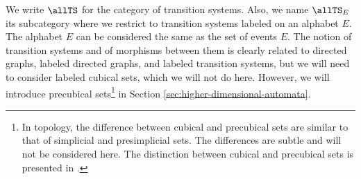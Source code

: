     
    We write $\allTS$ for the category of transition systems. Also, we name $\allTS_{E}$ its subcategory where we restrict to transition systems labeled on an alphabet $E$. The alphabet $E$ can be considered the same as the set of events $E$. The notion of transition systems and of morphisms between them is clearly related to directed graphs, labeled directed graphs, and labeled transition systems, but we will need to consider labeled cubical sets, which we will not do here. However, we will introduce precubical sets\footnote{In topology, the difference between cubical and precubical sets are similar to that of simplicial and presimplicial sets. The differences are subtle and will not be considered here. The distinction between cubical and precubical sets is presented in \cite{Goubault95PhDThesis}.} in Section \ref{sec:higher-dimensional-automata}.
    



    
